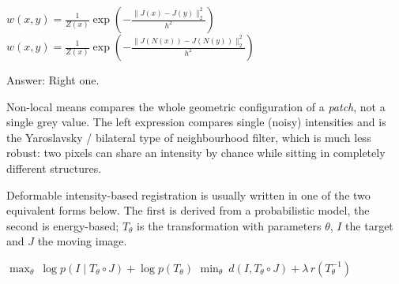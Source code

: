\documentclass[11pt]{exam}
\newcommand{\answerspace}[1]{\ifprintanswers\else\vspace{#1}\fi}
\begin{document}
\begin{questions}
\vspace{2mm}
\begin{center}
  $\displaystyle w(x,y) = \frac{1}{Z(x)} \exp\left(-\frac{\|J(x) - J(y)\|_2^2}{h^2}\right)$
  \hspace{1.6cm}
  $\displaystyle w(x,y) = \frac{1}{Z(x)} \exp\left(-\frac{\|J(N(x)) - J(N(y))\|_2^2}{h^2}\right)$
\end{center}
\vspace{2mm}

\begin{solution}
  Answer: Right one.

  Non-local means compares the whole geometric configuration of a \emph{patch}, not a single
  grey value. The left expression compares single (noisy) intensities and is the
  Yaroslavsky / bilateral type of neighbourhood filter, which is much less robust: two pixels
  can share an intensity by chance while sitting in completely different structures.
\end{solution}
\answerspace{1.2cm}

\question
Deformable intensity-based registration is usually written in one of the two equivalent forms
below. The first is derived from a probabilistic model, the second is energy-based;
$T_\theta$ is the transformation with parameters $\theta$, $I$ the target and $J$ the moving
image.

\vspace{2mm}
\begin{center}
  $\displaystyle \max_\theta\ \log p(I \mid T_\theta \circ J) + \log p(T_\theta)$
  \hspace{1.8cm}
  $\displaystyle \min_\theta\ d(I, T_\theta \circ J) + \lambda\, r(T_\theta^{-1})$
\end{center}
\vspace{2mm}

\end{questions}
\end{document}
